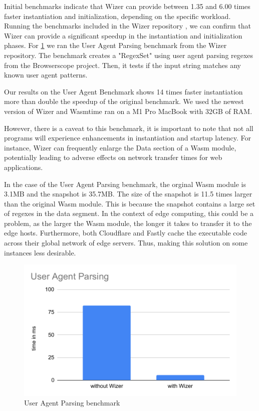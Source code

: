 Initial benchmarks indicate that Wizer can provide between 1.35 and 6.00 times faster instantiation and initialization, depending on the specific workload. Running the benchmarks included in the Wizer repository \cite{bytecodealliance_2023_wizer}, we can confirm that Wizer can provide a significant speedup in the instantiation and initialization phases. For \ref{fig:uap-bench} we ran the User Agent Parsing benchmark from the Wizer repository. The benchmark creates a "RegexSet" using user agent parsing regexes from the Browserscope project. Then, it tests if the input string matches any known user agent patterns. 

Our results on the User Agent Benchmark shows 14 times faster instantiation more than double the speedup of the original benchmark. We used the newest version of Wizer and Wasmtime ran on a M1 Pro MacBook with 32GB of RAM.

However, there is a caveat to this benchmark, it is important to note that not all programs will experience enhancements in instantiation and startup latency. For instance, Wizer can frequently enlarge the Data section of a Wasm module, potentially leading to adverse effects on network transfer times for web applications. 

In the case of the User Agent Parsing benchmark, the orginal Wasm module is 3.1MB and the snapshot is 35.7MB. The size of the snapshot is 11.5 times larger than the original Wasm module. This is because the snapshot contains a large set of regexes in the data segment.
In the context of edge computing, this could be a problem, as the larger the Wasm module, the longer it takes to transfer it to the edge hosts. Furthermore, both Cloudflare and Fastly cache the executable code across their global network of edge servers. Thus, making this solution on some instances less desirable. 

\begin{figure}[H]
	\centering
	\includegraphics[width=0.6\linewidth]{images/runtimes/UAP.pdf}
	\caption{User Agent Parsing benchmark}
	\label{fig:uap-bench}
\end{figure}


